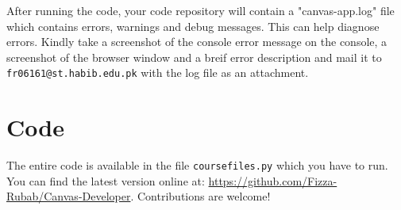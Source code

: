 \documentclass{article}
\begin{document}
After running the code, your code repository will contain a "canvas-app.log" file which contains errors, warnings and debug messages. This can help diagnose errors. Kindly take a screenshot of the console error message on the console, a
screenshot of the browser window and a breif error description and mail
it to \texttt{fr06161@st.habib.edu.pk} with the log file as an attachment.

\section{Code}

The entire code is available in the file \texttt{coursefiles.py} which
you have to run. You can find the latest version online at:
\url{https://github.com/Fizza-Rubab/Canvas-Developer}. Contributions are
welcome!
\end{document}
